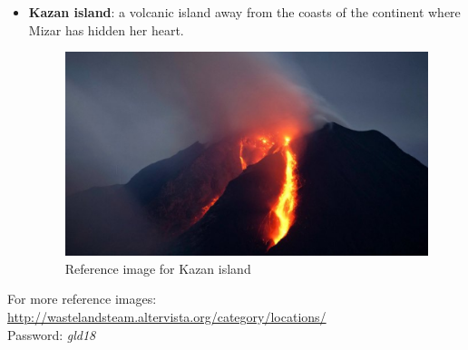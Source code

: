 \begin{itemize}
	\item \textbf{Kazan island}: a volcanic island away from the coasts of the continent where Mizar has hidden her heart.
	\begin{figure}[H]
	  \centering
	  \includegraphics[width=12cm]{../Images/Locations/kazanIsland}
	  \caption{Reference image for Kazan island}
	\end{figure}
	
\end{itemize}
For more reference images: \href{http://wastelandsteam.altervista.org/category/locations/}{http://wastelandsteam.altervista.org/category/locations/}\\
Password: \textit{gld18}
